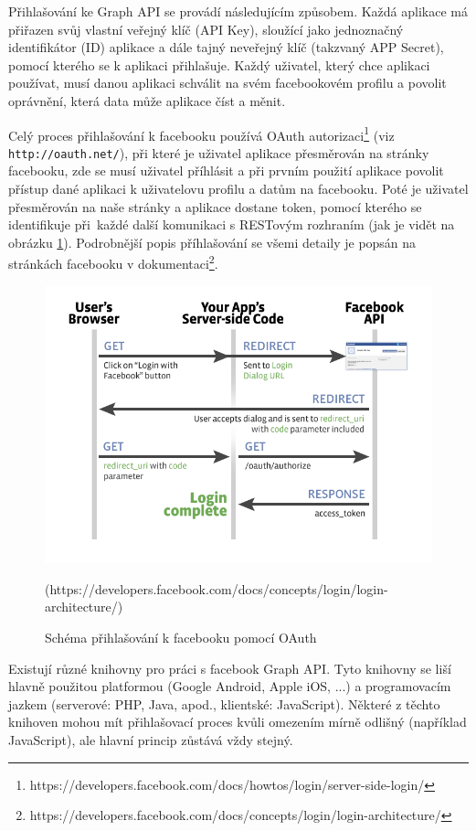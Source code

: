 \documentclass[thesis=M,czech]{FITthesis}[2013/05/10]
\begin{document}
Přihlašování ke Graph API se provádí následujícím způsobem. Každá aplikace má přiřazen svůj vlastní veřejný klíč (API Key), sloužící jako jednoznačný identifikátor (ID) aplikace a dále tajný neveřejný klíč (takzvaný APP Secret), pomocí kterého se k aplikaci přihlašuje. Každý uživatel, který chce aplikaci používat, musí danou aplikaci schválit na svém facebookovém profilu a povolit oprávnění, která data může aplikace číst a měnit.

Celý proces přihlašování k facebooku používá OAuth autorizaci\footnote{https://developers.facebook.com/docs/howtos/login/server-side-login/} (viz \verb|http://oauth.net/|), při které je uživatel aplikace přesměrován na stránky facebooku, zde se musí uživatel příhlásit a při prvním použití aplikace povolit přístup dané aplikaci k uživatelovu profilu a datům na facebooku. Poté je uživatel přesměrován na naše stránky a aplikace dostane token, pomocí kterého se identifikuje při~každé další komunikaci s RESTovým rozhraním  (jak je vidět na obrázku \ref{fig:oAuthDiagram}). Podrobnější popis příhlašování se všemi detaily je popsán na stránkách facebooku v dokumentaci\footnote{https://developers.facebook.com/docs/concepts/login/login-architecture/}. 

\begin{figure}[h]
\begin{center}
\includegraphics[width=5in]{figures/server-side-diagram.png}
\caption{Schéma přihlašování k facebooku pomocí OAuth}
(https://developers.facebook.com/docs/concepts/login/login-architecture/)
\label{fig:oAuthDiagram}
\end{center}
\end{figure}

Existují různé knihovny pro práci s facebook Graph API. Tyto knihovny se liší hlavně použitou platformou (Google Android, Apple iOS, ...) a programovacím jazkem (serverové: PHP, Java, apod., klientské: JavaScript). Některé z těchto knihoven mohou mít přihlašovací proces kvůli omezením mírně odlišný (například JavaScript), ale hlavní princip zůstává vždy stejný.
\end{document}
